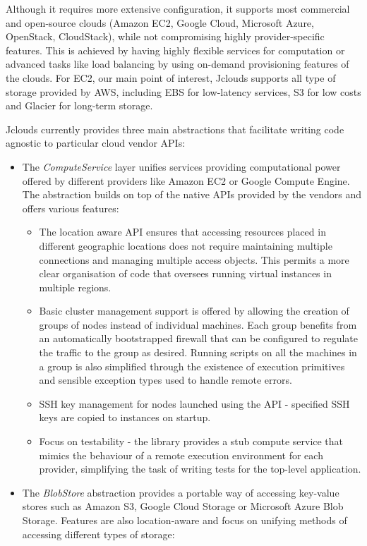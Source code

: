 Although it requires more extensive configuration, it supports most commercial and open-source clouds (Amazon EC2, Google Cloud, Microsoft Azure, OpenStack, CloudStack), while not compromising highly provider-specific features. This is achieved by having highly flexible services for computation or advanced tasks like load balancing by using on-demand provisioning features of the clouds. For EC2, our main point of interest, Jclouds supports all type of storage provided by AWS, including EBS for low-latency services, S3 for low costs and Glacier for long-term storage.

Jclouds currently provides three main abstractions that facilitate writing code agnostic to particular cloud vendor APIs:
\begin{itemize}
	\item The \textit{ComputeService} layer unifies services providing computational power offered by different providers like Amazon EC2 or Google Compute Engine. The abstraction builds on top of the native APIs provided by the vendors and offers various features:
	\begin{itemize}
		\item The location aware API ensures that accessing resources placed in different geographic locations does not require maintaining multiple connections and managing multiple access objects. This permits a more clear organisation of code that oversees running virtual instances in multiple regions.
		\item Basic cluster management support is offered by allowing the creation of groups of nodes instead of individual machines. Each group benefits from an automatically bootstrapped firewall that can be configured to regulate the traffic to the group as desired. Running scripts on all the machines in a group is also simplified through the existence of execution primitives and sensible exception types used to handle remote errors.
		\item SSH key management for nodes launched using the API - specified SSH keys are copied to instances on startup.
		\item Focus on testability - the library provides a stub compute service that mimics the behaviour of a remote execution environment for each provider, simplifying the task of writing tests for the top-level application.
	\end{itemize}
	\item The \textit{BlobStore} abstraction provides a portable way of accessing key-value stores such as Amazon S3, Google Cloud Storage or Microsoft Azure Blob Storage. Features are also location-aware and focus on unifying methods of accessing different types of storage:

\end{itemize}

